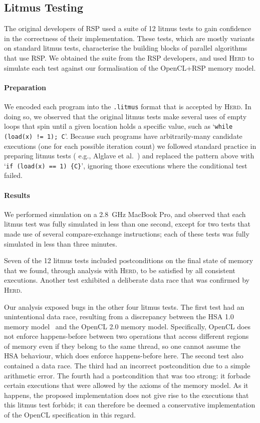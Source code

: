 \documentclass[svgnames,10pt]{sigplanconf}
\theoremstyle{definition}
\newcommand\herd{\textsc{Herd}}
\begin{document}
\subsection{Litmus Testing}
\label{sec:litmus_testing}

The original developers of RSP used a suite of 12 litmus tests to
gain confidence in the correctness of their implementation. These
tests, which are mostly variants on standard litmus tests,
characterise the building blocks of parallel algorithms that use RSP.
We obtained the suite from the RSP developers, and used \herd{} to
simulate each test against our formalisation of the OpenCL+RSP memory
model.

\paragraph{Preparation} 
We encoded each program into the \texttt{.litmus} format that is
accepted by \herd{}. In doing so, we observed that the
original litmus tests make several uses of empty loops that spin until
a given location holds a specific value, such as `\texttt{while
(load(x) != 1); C}'. Because such programs have arbitrarily-many
candidate executions (one for each possible iteration count) we
followed standard practice in preparing litmus tests (
e.g., Alglave et al.~\cite{alglave+15}) and replaced the pattern above with
`\texttt{if (load(x) == 1) \{C\}}', ignoring those executions where
the conditional test failed.

\paragraph{Results}
We performed simulation on a 2.8~GHz MacBook Pro, and observed that
each litmus test was fully simulated in less than one second, except
for two tests that made use of several compare-exchange instructions;
each of these tests was fully simulated in less than three minutes.

Seven of the 12 litmus tests included postconditions on the final
state of memory that we found, through analysis with \herd{}, to be
satisfied by all consistent executions.  Another test exhibited a
deliberate data race that was confirmed by \herd{}.

Our analysis exposed bugs in the other four litmus tests. The
first test had an unintentional data race, resulting from a
discrepancy between the HSA 1.0 memory model~\cite{kyriazis+12} and
the OpenCL 2.0 memory model. Specifically, OpenCL does not enforce
happens-before between two operations that access different regions of
memory even if they belong to the same thread,
so one cannot
assume the HSA behaviour, which does enforce happens-before here.
The second test also contained a data race. The third had an incorrect postcondition due to a simple arithmetic
error. The fourth had a postcondition that was too strong: it forbade
certain executions that were allowed by the axioms of the memory
model. As it happens, the proposed implementation does not give rise
to the executions that this litmus test forbids; it can therefore be
deemed a conservative implementation of the OpenCL specification in
this regard.
\end{document}

